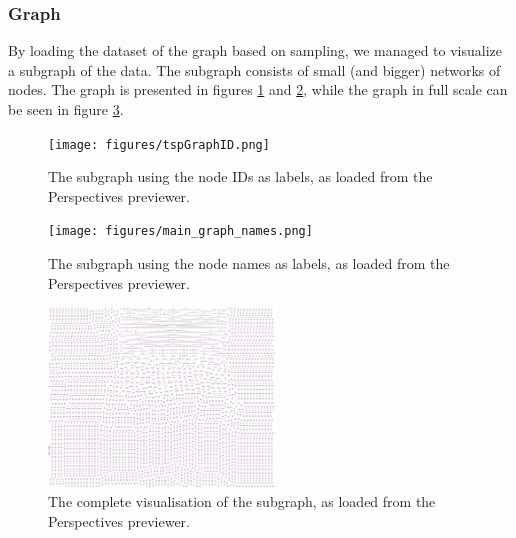 \documentclass[sigconf, nonacm]{acmart}
\begin{document}
\subsubsection{Graph}
By loading the dataset of the graph based on sampling, we managed to visualize a subgraph of the data. The subgraph consists of small (and bigger) networks of nodes. The graph is presented in figures \ref{fig:graphTSPIDs} and \ref{fig:graphTSPNames}, while the graph in full scale can be seen in figure \ref{fig:full-graph}.
\begin{figure}[htp]
    \centering
    \texttt{[image: figures/tspGraphID.png]}
    \caption{The subgraph using the node IDs as labels, as loaded from the Perspectives previewer.}
    \label{fig:graphTSPIDs}
\end{figure}

\begin{figure}[htp]
    \centering
    \texttt{[image: figures/main\_graph\_names.png]}
    \caption{The subgraph using the node names as labels, as loaded from the Perspectives previewer.}
    \label{fig:graphTSPNames}
\end{figure}

\begin{figure}[htp]
    \centering
    \includegraphics[width=6cm]{figures/tspGraphIDs.png}
    \caption{The complete visualisation of the subgraph, as loaded from the Perspectives previewer.}
    \label{fig:full-graph}
\end{figure}
\end{document}
